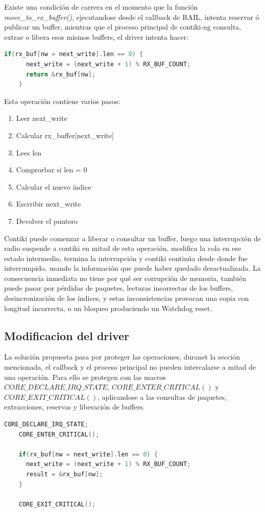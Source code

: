   Existe una condición de carrera en el momento que la función \textit{move\_to\_rx\_buffer()}, ejecutandose desde el callback de RAIL,
  intenta reservar ó publicar un buffer, mientras que el proceso principal de contiki-ng consulta, extrae o libera esos mismos buffers,
  el driver intenta hacer: 

  \begin{lstlisting}[language=C, caption = {Sección crítica original para comprobar la disponibilidad de un buffer RX y actualizar el índice de escritura.}]
    if(rx_buf[nw = next_write].len == 0) {
      next_write = (next_write + 1) % RX_BUF_COUNT;
      return &rx_buf[nw];
    }
  \end{lstlisting}

  Esta operación contiene varios pasos:
  
  \begin{enumerate}
    \item Leer next\_write
    \item Calcular rx\_buffer[next\_write]
    \item Lees len
    \item Comprorbar si len = 0
    \item Calcular el nuevo índice
    \item Escrribir next\_write
    \item Devolver el puntero
\end{enumerate}

  Contiki puede comenzar a liberar o consultar un buffer, luego una interrupción de radio suspende a contiki en mitad de esta operación, modifica la cola en 
  ese estado intermedio, termina la interrupción y contiki continúa desde donde fue interrumpido, usando la información que puede haber quedado desactualizada. 
  La consecuencia inmediata no tiene por qué ser corrupción de memoria, también puede pasar por pérdidas de paquetes, lecturas incorrectas de los buffers, 
  desincronización de los índices, y estas inconsistencias provocan una copia con longitud incorrecta, o un bloqueo produciendo un Watchdog reset. 

  \subsection{Modificacion del driver}

  La solución propuesta pasa por proteger las operaciones, duranet la sección mencionada, el callback y el proceso principal 
  no pueden intercalarse a mitad de una operación. Para ello se protegen con las macros $CORE\_DECLARE\_IRQ\_STATE$, $CORE\_ENTER\_CRITICAL()$ y $CORE\_EXIT\_CRITICAL()$,
  aplicandose a las consultas de paquetes, extracciones, reservas y liberación de buffers. 
\clearpage
  \begin{lstlisting}[language=C, caption = {Protección atómica de la reserva de un buffer RX mediante una sección crítica.}]
    CORE_DECLARE_IRQ_STATE;
    CORE_ENTER_CRITICAL();

    if(rx_buf[nw = next_write].len == 0) {
      next_write = (next_write + 1) % RX_BUF_COUNT;
      result = &rx_buf[nw];
    }

    CORE_EXIT_CRITICAL();
  \end{lstlisting}

